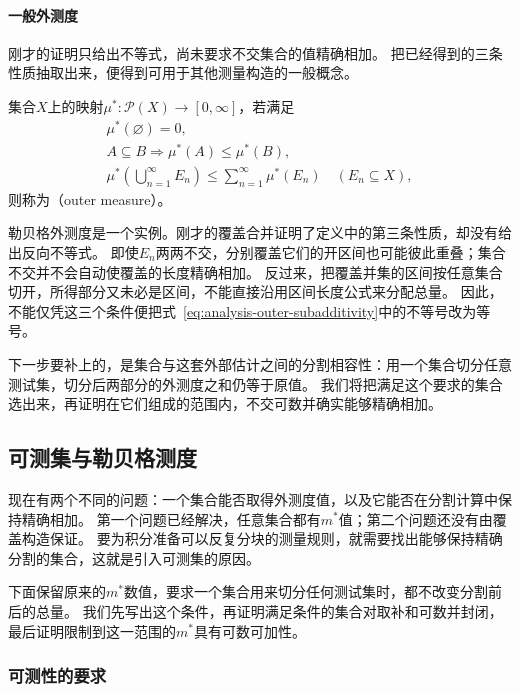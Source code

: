 \paragraph{一般外测度}

刚才的证明只给出不等式，尚未要求不交集合的值精确相加。
把已经得到的三条性质抽取出来，便得到可用于其他测量构造的一般概念。
\begin{definition}[外测度]
\label{def:analysis-outer-measure}
集合$X$上的映射$\mu^*:\mathcal P(X)\to[0,\infty]$，若满足
\[
 \begin{gathered}
 \mu^*(\varnothing)=0,\\
 A\subseteq B\Longrightarrow\mu^*(A)\leq\mu^*(B),\\
 \mu^*\left(\bigcup_{n=1}^{\infty}E_n\right)\leq\sum_{n=1}^{\infty}\mu^*(E_n)
 \quad(E_n\subseteq X),
 \end{gathered}
\]
则称为（outer measure）。
\end{definition}
勒贝格外测度是一个实例。刚才的覆盖合并证明了定义中的第三条性质，却没有给出反向不等式。
即使$E_n$两两不交，分别覆盖它们的开区间也可能彼此重叠；集合不交并不会自动使覆盖的长度精确相加。
反过来，把覆盖并集的区间按任意集合切开，所得部分又未必是区间，不能直接沿用区间长度公式来分配总量。
因此，不能仅凭这三个条件便把式~\eqref{eq:analysis-outer-subadditivity}中的不等号改为等号。

下一步要补上的，是集合与这套外部估计之间的分割相容性：用一个集合切分任意测试集，切分后两部分的外测度之和仍等于原值。
我们将把满足这个要求的集合选出来，再证明在它们组成的范围内，不交可数并确实能够精确相加。

\subsection{可测集与勒贝格测度}
\label{sec:analysis-lebesgue-measurable-construction}

现在有两个不同的问题：一个集合能否取得外测度值，以及它能否在分割计算中保持精确相加。
第一个问题已经解决，任意集合都有$m^*$值；第二个问题还没有由覆盖构造保证。
要为积分准备可以反复分块的测量规则，就需要找出能够保持精确分割的集合，这就是引入可测集的原因。

下面保留原来的$m^*$数值，要求一个集合用来切分任何测试集时，都不改变分割前后的总量。
我们先写出这个条件，再证明满足条件的集合对取补和可数并封闭，最后证明限制到这一范围的$m^*$具有可数可加性。

\subsubsection{可测性的要求}


